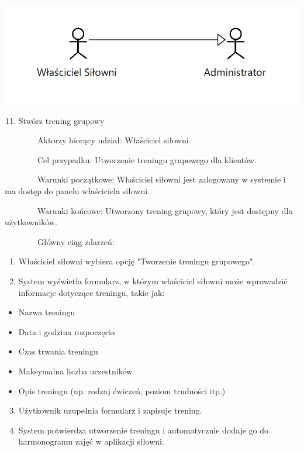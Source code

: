\documentclass[
]{article}
\providecommand{\tightlist}{%
  \setlength{\itemsep}{0pt}\setlength{\parskip}{0pt}}
\begin{document}
{\includegraphics{diagrams/use_cases/wlasciciel_silowni_hierarchy.png}}

\begin{enumerate}
\setcounter{enumi}{10}
\tightlist
\item
  {Stwórz trening grupowy}
\end{enumerate}

{~~~~~~~~}{Aktorzy biorący udział: Właściciel siłowni}

{~~~~~~~~Cel przypadku: Utworzenie treningu grupowego dla klientów.}

{~~~~~~~~Warunki początkowe: Właściciel siłowni jest zalogowany w
systemie i ma dostęp do panelu właściciela siłowni.}

{~~~~~~~~Warunki końcowe: Utworzony trening grupowy, który jest dostępny
dla użytkowników.}

{~~~~~~~~Główny ciąg zdarzeń:}

\begin{enumerate}
\tightlist
\item
  {Właściciel siłowni wybiera opcję "Tworzenie treningu grupowego".}
\item
  {System wyświetla formularz, w którym właściciel siłowni może
  wprowadzić informacje dotyczące treningu, takie jak:}
\end{enumerate}

\begin{itemize}
\tightlist
\item
  {Nazwa treningu}
\item
  {Data i godzina rozpoczęcia}
\item
  {Czas trwania treningu}
\item
  {Maksymalna liczba uczestników}
\item
  {Opis treningu (np. rodzaj ćwiczeń, poziom trudności itp.)}
\end{itemize}

\begin{enumerate}
\setcounter{enumi}{2}
\tightlist
\item
  {Użytkownik uzupełnia formularz i zapisuje trening.}
\item
  {System potwierdza utworzenie treningu i automatycznie dodaje go do
  harmonogramu zajęć w aplikacji siłowni.}
\end{enumerate}
\end{document}
